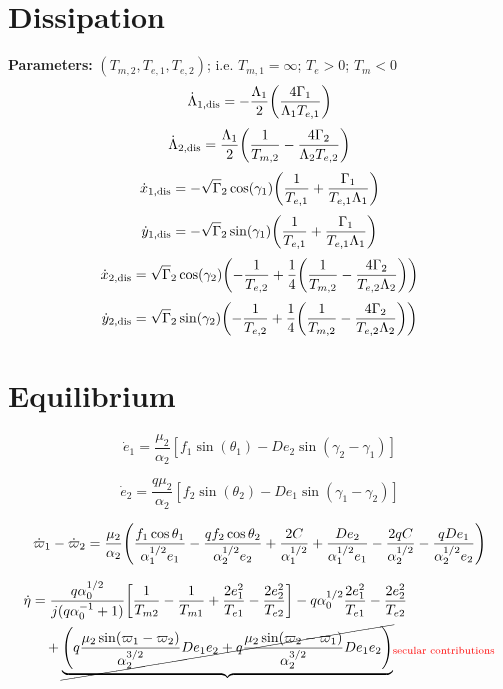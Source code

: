 \documentclass[12pt]{article}
\DeclarePairedDelimiter{\br}{[}{]}
\DeclarePairedDelimiter{\p}{(}{)}
\begin{document}
\section{Dissipation}
\textbf{Parameters:} $(T_{m,2}, T_{e,1}, T_{e,2})$; i.e. $T_{m,1} = \infty$; $T_e>0$; $T_m<0$
\begin{equation}
  \dot{\Lambda}_{1,\rm{dis}} = -\frac{\Lambda_1}{2}\p*{\frac{4\Gamma_1}{\Lambda_1T_{e,1}}}
\end{equation}
\begin{equation}
  \dot{\Lambda}_{2,\rm{dis}} = \frac{\Lambda_1}{2}\p*{\frac{1}{T_{m,2}}-\frac{4\Gamma_2}{\Lambda_2T_{e,2}}}
\end{equation}
\begin{equation}
 \dot x_{1,\rm{dis}} = -\sqrt \Gamma_2\cos(\gamma_1) \p*{\frac{1}{T_{e,1}} + \frac{\Gamma_1}{T_{e,1}\Lambda_1}}
\end{equation}
\begin{equation}
 \dot y_{1,\rm{dis}} = -\sqrt \Gamma_2\sin(\gamma_1) \p*{\frac{1}{T_{e,1}} + \frac{\Gamma_1}{T_{e,1}\Lambda_1}}
\end{equation}
\begin{equation}
 \dot x_{2,\rm{dis}} = \sqrt \Gamma_2\cos(\gamma_2) \p*{-\frac{1}{T_{e,2}} +\frac14\p*{\frac{1}{T_{m,2}}- \frac{4\Gamma_2}{T_{e,2}\Lambda_2}}}
\end{equation}
\begin{equation}
 \dot y_{2,\rm{dis}} = \sqrt \Gamma_2\sin(\gamma_2) \p*{-\frac{1}{T_{e,2}} +\frac14\p*{\frac{1}{T_{m,2}}- \frac{4\Gamma_2}{T_{e,2}\Lambda_2}}}
\end{equation}
\section{Equilibrium}
\begin{equation}
  \dot e_1 = \frac{\mu_2}{\alpha_2} [f_1\sin(\theta_1) - De_2 \sin(\gamma_2-\gamma_1)]
\end{equation}

\begin{equation}
  \dot e_2 = \frac{q\mu_2}{\alpha_2} [f_2\sin(\theta_2) - De_1 \sin(\gamma_1-\gamma_2)]
\end{equation}

\begin{equation}
  \dot\varpi_1-\dot\varpi_2 = \frac{\mu_2}{\alpha_2}\p*{ \frac{f_1\cos\theta_1}{\alpha_1^{1/2} e_1} - \frac{qf_2\cos\theta_2}{\alpha_2^{1/2}e_2}
    + \frac{2C}{\alpha_1^{1/2}} + \frac{De_2}{\alpha_1^{1/2} e_1} - \frac{2qC}{\alpha_2^{1/2}} - \frac{qDe_1}{ \alpha_2^{1/2}e_2}}
\end{equation}

\begin{align*}
  \dot\eta &= \frac{q\alpha_0^{1/2}}{j(q\alpha_0^{-1}+1)}\br*{ \frac{1}{T_{m2}} - \frac{1}{T_{m1}}
      + \frac{2e_1^2}{T_{e1}}- \frac{2e_2^2}{T_{e2}}}
    - q\alpha_0^{1/2}\frac{2e_1^2}{T_{e1}} - \frac{2e_2^2}{T_{e2}}\\
    &\quad+ \cancel{\underbrace{\p*{q \frac{\mu_2\sin(\varpi_1 -\varpi_2)}{\alpha_2^{3/2}}De_1e_2
      + q\frac{\mu_2\sin(\varpi_2 -\varpi_1)}{\alpha_2^{3/2}}De_1e_2}}}_{{\color{red}\text{secular contributions}}}
\end{align*}
\end{document}
